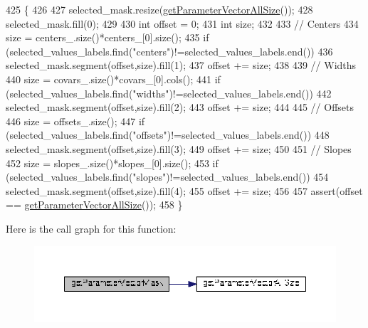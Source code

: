 \begin{DoxyCode}
425 \{
426 
427   selected\_mask.resize(\hyperlink{classDmpBbo_1_1UnifiedModel_ab24d2485b3b795b516f4844f225100eb}{getParameterVectorAllSize}());
428   selected\_mask.fill(0);
429   
430   \textcolor{keywordtype}{int} offset = 0;
431   \textcolor{keywordtype}{int} size;
432   
433   \textcolor{comment}{// Centers}
434   size = centers\_.size()*centers\_[0].size();
435   \textcolor{keywordflow}{if} (selected\_values\_labels.find(\textcolor{stringliteral}{"centers"})!=selected\_values\_labels.end())
436     selected\_mask.segment(offset,size).fill(1);
437   offset += size;
438   
439   \textcolor{comment}{// Widths}
440   size = covars\_.size()*covars\_[0].cols();
441   \textcolor{keywordflow}{if} (selected\_values\_labels.find(\textcolor{stringliteral}{"widths"})!=selected\_values\_labels.end())
442     selected\_mask.segment(offset,size).fill(2);
443   offset += size;
444   
445   \textcolor{comment}{// Offsets}
446   size = offsets\_.size();
447   \textcolor{keywordflow}{if} (selected\_values\_labels.find(\textcolor{stringliteral}{"offsets"})!=selected\_values\_labels.end())
448     selected\_mask.segment(offset,size).fill(3);
449   offset += size;
450 
451   \textcolor{comment}{// Slopes}
452   size = slopes\_.size()*slopes\_[0].size();
453   \textcolor{keywordflow}{if} (selected\_values\_labels.find(\textcolor{stringliteral}{"slopes"})!=selected\_values\_labels.end())
454     selected\_mask.segment(offset,size).fill(4);
455   offset += size;
456 
457   assert(offset == \hyperlink{classDmpBbo_1_1UnifiedModel_ab24d2485b3b795b516f4844f225100eb}{getParameterVectorAllSize}());   
458 \}
\end{DoxyCode}


Here is the call graph for this function\+:
\nopagebreak
\begin{figure}[H]
\begin{center}
\leavevmode
\includegraphics[width=350pt]{classDmpBbo_1_1UnifiedModel_a9dba1f93e426e7511630ec1ece4ace17_cgraph}
\end{center}
\end{figure}


